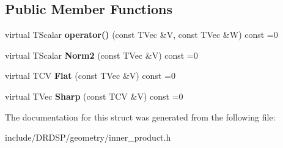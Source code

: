 \subsection*{Public Member Functions}
\begin{DoxyCompactItemize}
\item 
\hypertarget{struct_d_r_d_s_p_1_1_inner_product_a031062be7cf0accf6edcd6f2548551e6}{virtual T\-Scalar {\bfseries operator()} (const T\-Vec \&V, const T\-Vec \&W) const =0}\label{struct_d_r_d_s_p_1_1_inner_product_a031062be7cf0accf6edcd6f2548551e6}

\item 
\hypertarget{struct_d_r_d_s_p_1_1_inner_product_af1060a7d135de0be40781a0f2274b278}{virtual T\-Scalar {\bfseries Norm2} (const T\-Vec \&V) const =0}\label{struct_d_r_d_s_p_1_1_inner_product_af1060a7d135de0be40781a0f2274b278}

\item 
\hypertarget{struct_d_r_d_s_p_1_1_inner_product_a21893f0870c563cb8399b9e8897afa79}{virtual T\-C\-V {\bfseries Flat} (const T\-Vec \&V) const =0}\label{struct_d_r_d_s_p_1_1_inner_product_a21893f0870c563cb8399b9e8897afa79}

\item 
\hypertarget{struct_d_r_d_s_p_1_1_inner_product_a075af7a56185206cd221c93a834bc354}{virtual T\-Vec {\bfseries Sharp} (const T\-C\-V \&V) const =0}\label{struct_d_r_d_s_p_1_1_inner_product_a075af7a56185206cd221c93a834bc354}

\end{DoxyCompactItemize}


The documentation for this struct was generated from the following file\-:\begin{DoxyCompactItemize}
\item 
include/\-D\-R\-D\-S\-P/geometry/inner\-\_\-product.\-h\end{DoxyCompactItemize}
